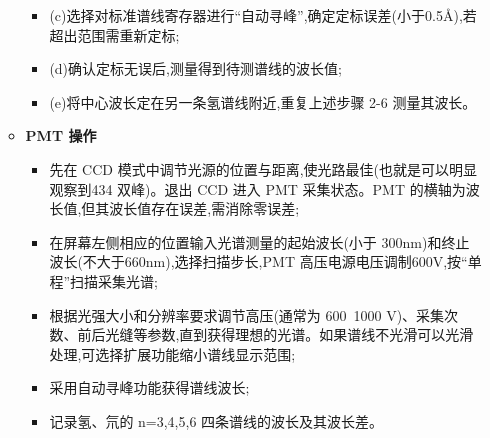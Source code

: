 \documentclass[12pt, a4paper]{article}
\begin{document}
\begin{enumerate}
\begin{itemize}
\begin{itemize}
                \item  (c)选择对标准谱线寄存器进行“自动寻峰”,确定定标误差(小于0.5Å),若超出范围需重新定标;
                \item   (d)确认定标无误后,测量得到待测谱线的波长值;
                \item  (e)将中心波长定在另一条氢谱线附近,重复上述步骤 2-6 测量其波长。
            \end{itemize}
        \item \textbf{PMT 操作}
            \begin{itemize}
                \item 先在 CCD 模式中调节光源的位置与距离,使光路最佳(也就是可以明显观察到434 双峰)。退出 CCD 进入 PMT 采集状态。PMT 的横轴为波长值,但其波长值存在误差,需消除零误差;
                \item 在屏幕左侧相应的位置输入光谱测量的起始波长(小于 300nm)和终止波长(不大于660nm),选择扫描步长,PMT 高压电源电压调制600V,按“单程”扫描采集光谱;
                \item 根据光强大小和分辨率要求调节高压(通常为 600~1000 V)、采集次数、前后光缝等参数,直到获得理想的光谱。如果谱线不光滑可以光滑处理,可选择扩展功能缩小谱线显示范围;
                \item 采用自动寻峰功能获得谱线波长;
                \item 记录氢、氘的 n=3,4,5,6 四条谱线的波长及其波长差。
            \end{itemize}
        \end{itemize}
    
\end{enumerate}
\end{document}

